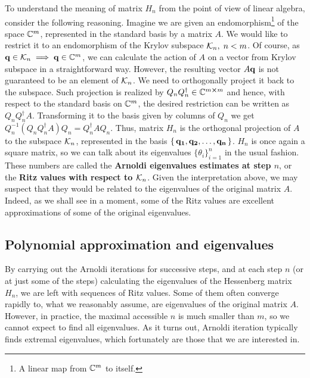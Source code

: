 To understand the meaning
of matrix \(H_n\) from the point of view of linear algebra, consider the following reasoning. Imagine we are
given an endomorphism\footnote{A linear map from \(\mathbb{C}^m\) to itself.}
of the space \(\mathbb{C}^m\), represented in the standard basis by a matrix \(A\).
We would like to restrict it to an endomorphism of the Krylov subspace \(\mathcal{K}_{n},\; n < m\). Of course,
as \(\vectorbold{q} \in \K{n} \implies \vectorbold{q} \in \CC^m\), we can calculate the action of \(A\) on a vector
from Krylov subspace in a straightforward way. However, the resulting vector \(A\vectorbold{q}\) is not guaranteed
to be an element of \(\mathcal{K}_{n}\). We need to orthogonally project it back to the subspace. Such projection
is realized by \(Q_n Q^{\dagger}_n \in \mathbb{C}^{m\cross m}\) and hence, with respect to the standard basis on \(\mathbb{C}^m\),
the desired restriction can be written as \(Q_n Q^{\dagger}_n A\). Transforming it to the basis given by columns of
\(Q_n\) we get \( Q_n^{-1}\left(Q_n Q^{\dagger}_n A\right)Q_n = Q^{\dagger}_n A Q_n\). Thus, matrix \(H_n\)
is the orthogonal projection of \(A\) to the subspace \(\mathcal{K}_{n}\), represented in the basis
\(\{\,\vectorbold{q_1},\vectorbold{q_2},\ldots,\vectorbold{q_n}\,\}\).
\(H_n\) is once again a square matrix, so we can talk about its eigenvalues \(\{\theta_i\}_{i = 1}^n\)
in the usual fashion. These numbers are called the \textbf{Arnoldi eigenvalues estimates at step \(n\)}, or
the \textbf{Ritz values with respect to \(\mathcal{K}_{n}\)}.
Given the interpretation above, we may suspect that they would be related to the eigenvalues of the original matrix \(A\).
Indeed, as we shall see in a moment, some of the Ritz values are excellent approximations of some of the
original eigenvalues.


\subsection{Polynomial approximation and eigenvalues}

By carrying out the Arnoldi iterations for successive steps, and at each step \(n\) (or at just some of the steps)
calculating the eigenvalues of the Hessenberg matrix \(H_n\), we are left with sequences of Ritz values. Some
of them often converge rapidly to, what we reasonably assume, are eigenvalues of the original matrix \(A\).
However, in practice, the maximal accessible \(n\) is much smaller than \(m\), so we cannot expect to find
all eigenvalues. As it turns out, Arnoldi iteration typically finds extremal eigenvalues, which fortunately
are those that we are interested in.


